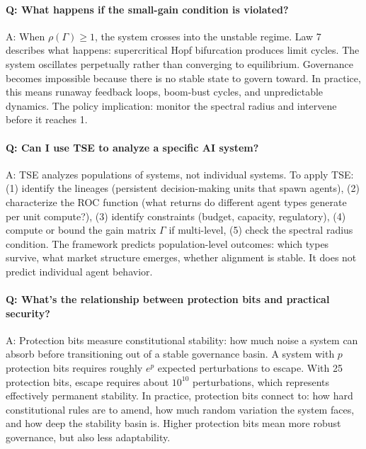 \documentclass[12pt]{article}
\begin{document}
\paragraph{Q: What happens if the small-gain condition is violated?}

A: When $\rho(\Gamma) \geq 1$, the system crosses into the unstable regime. Law 7 describes what happens: supercritical Hopf bifurcation produces limit cycles. The system oscillates perpetually rather than converging to equilibrium. Governance becomes impossible because there is no stable state to govern toward. In practice, this means runaway feedback loops, boom-bust cycles, and unpredictable dynamics. The policy implication: monitor the spectral radius and intervene before it reaches 1.

\paragraph{Q: Can I use TSE to analyze a specific AI system?}

A: TSE analyzes populations of systems, not individual systems. To apply TSE: (1) identify the lineages (persistent decision-making units that spawn agents), (2) characterize the ROC function (what returns do different agent types generate per unit compute?), (3) identify constraints (budget, capacity, regulatory), (4) compute or bound the gain matrix $\Gamma$ if multi-level, (5) check the spectral radius condition. The framework predicts population-level outcomes: which types survive, what market structure emerges, whether alignment is stable. It does not predict individual agent behavior.

\paragraph{Q: What's the relationship between protection bits and practical security?}

A: Protection bits measure constitutional stability: how much noise a system can absorb before transitioning out of a stable governance basin. A system with $p$ protection bits requires roughly $e^p$ expected perturbations to escape. With 25 protection bits, escape requires about $10^{10}$ perturbations, which represents effectively permanent stability. In practice, protection bits connect to: how hard constitutional rules are to amend, how much random variation the system faces, and how deep the stability basin is. Higher protection bits mean more robust governance, but also less adaptability.
\end{document}
